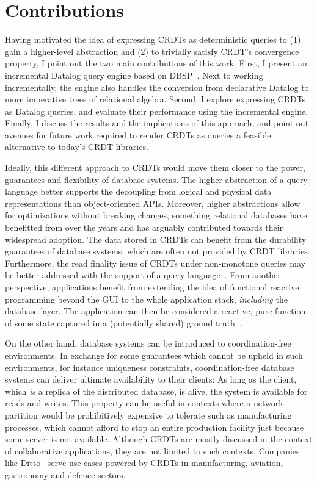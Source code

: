 \section{Contributions}


Having motivated the idea of expressing \acp{CRDT} as deterministic queries to
(1) gain a higher-level abstraction and (2) to trivially satisfy \ac{CRDT}'s
convergence property,
I point out the two main contributions of this work.
First, I present an incremental Datalog query engine based on DBSP~\cite{budiu2022dbsp}.
Next to working incrementally, the engine also handles the conversion from
declarative Datalog to more imperative trees of relational algebra.
Second, I explore expressing \acp{CRDT} as Datalog queries, and evaluate
their performance using the incremental engine.
Finally, I discuss the results and the implications of this approach,
and point out avenues for future work required to render \acp{CRDT} as queries
a feasible alternative to today's \ac{CRDT} libraries.

Ideally, this different approach to \acp{CRDT} would move them closer to the power,
guarantees and flexibility of database systems.
The higher abstraction of a query language better supports the decoupling from
logical and physical data representations than object-oriented APIs.
Moreover, higher abstractions allow for optimizations without breaking changes,
something relational databases have benefitted from over the years and has
arguably contributed towards their widespread adoption.
The data stored in \acp{CRDT} can benefit from the durability guarantees of
database systems, which are often not provided by \ac{CRDT} libraries.
Furthermore, the read finality issue of \acp{CRDT} under non-monotone queries
may be better addressed with the support of a query language~\cite{laddad2022keep}.
From another perspective, applications benefit from extending the idea of functional
reactive programming beyond the \ac{GUI} to the whole application stack,
\emph{including} the database layer.
The application can then be considered a reactive, pure function
of some state captured in a (potentially shared) ground truth~\cite{litt2023riffle}.

On the other hand, database systems can be introduced to coordination-free
environments.
In exchange for some guarantees which cannot be upheld in such environments,
for instance uniqueness constraints,
coordination-free database systems can deliver ultimate availability
to their clients:
As long as the client, which \emph{is} a replica of the distributed database,
is alive, the system is available for reads and writes.
This property can be useful in contexts where a network partition would be
prohibitively expensive to tolerate such as manufacturing processes,
which cannot afford to stop an entire production facility just because
some server is not available.
Although \acp{CRDT} are mostly discussed in the context of collaborative
applications, they are not limited to such contexts.
Companies like Ditto~\cite{ditto} serve use cases powered by \acp{CRDT}
in manufacturing, aviation, gastronomy and defence sectors.

